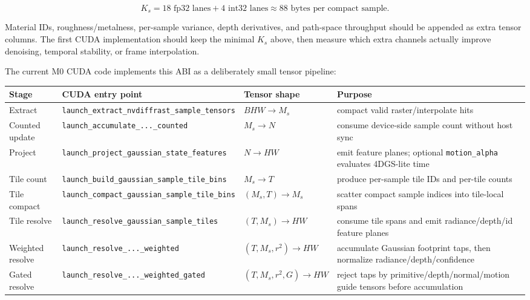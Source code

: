 \documentclass[11pt]{article}
\begin{document}
\[
  K_s = 18\text{ fp32 lanes} + 4\text{ int32 lanes}
      \approx 88\text{ bytes per compact sample}.
\]

Material IDs, roughness/metalness, per-sample variance, depth derivatives, and
path-space throughput should be appended as extra tensor columns. The first
CUDA implementation should keep the minimal $K_s$ above, then measure which
extra channels actually improve denoising, temporal stability, or frame
interpolation.


The current M0 CUDA code implements this ABI as a deliberately small tensor
pipeline:

\begin{center}
\begin{tabular}{llll}
\toprule
Stage & CUDA entry point & Tensor shape & Purpose \\
\midrule
Extract & \texttt{launch\_extract\_nvdiffrast\_sample\_tensors} & $BHW\rightarrow M_s$ & compact valid raster/interpolate hits \\
Counted update & \texttt{launch\_accumulate\_...\_counted} & $M_s\rightarrow N$ & consume device-side sample count without host sync \\
Project & \texttt{launch\_project\_gaussian\_state\_features} & $N\rightarrow HW$ & emit feature planes; optional \texttt{motion\_alpha} evaluates 4DGS-lite time \\
Tile count & \texttt{launch\_build\_gaussian\_sample\_tile\_bins} & $M_s\rightarrow T$ & produce per-sample tile IDs and per-tile counts \\
Tile compact & \texttt{launch\_compact\_gaussian\_sample\_tile\_bins} & $(M_s,T)\rightarrow M_s$ & scatter compact sample indices into tile-local spans \\
Tile resolve & \texttt{launch\_resolve\_gaussian\_sample\_tiles} & $(T,M_s)\rightarrow HW$ & consume tile spans and emit radiance/depth/id feature planes \\
Weighted resolve & \texttt{launch\_resolve\_...\_weighted} & $(T,M_s,r^2)\rightarrow HW$ & accumulate Gaussian footprint taps, then normalize radiance/depth/confidence \\
Gated resolve & \texttt{launch\_resolve\_...\_weighted\_gated} & $(T,M_s,r^2,G)\rightarrow HW$ & reject taps by primitive/depth/normal/motion guide tensors before accumulation \\
\bottomrule
\end{tabular}
\end{center}
\end{document}
